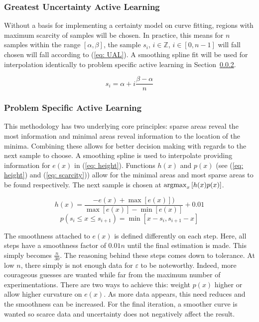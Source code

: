 \subsubsection{Greatest Uncertainty Active Learning}
Without a basis for implementing a certainty model on curve fitting, regions with maximum scarcity of samples will be chosen. In practice, this means for $n$ samples within the range $[\alpha, \beta]$, the sample $s_i$, $i\in\mathbb{Z}$, $i\in[0, n-1]$ will fall chosen will fall according to (\ref{eq: UAL}). A smoothing spline fit will be used for interpolation identically to problem specific active learning in Section~\ref{sssec:Active Learning}.

\begin{equation}
  \label{eq: UAL}
  s_i=\alpha+i\frac{\beta-\alpha}{n}
\end{equation}

\subsubsection{Problem Specific Active Learning}
\label{sssec:Active Learning}
This methodology has two underlying core principles: sparse areas reveal the most information and minimal areas reveal information to the location of the minima. Combining these allows for better decision making with regards to the next sample to choose. A smoothing spline is used to interpolate providing information for $e(x)$ in (\ref{eq: height}). Functions $h(x)$ and $p(x)$ (see (\ref{eq: height}) and (\ref{eq: scarcity})) allow for the minimal areas and most sparse areas to be found respectively. The next sample is chosen at ${\operatorname*{argmax}_x{[h(x)p(x)]}}$.

\begin{equation}
  \label{eq: height}
  {h(x)=\frac{-e(x)+\max[e(x)])}{\max[e(x)]-\min[e(x)]}}+0.01
\end{equation}
\begin{equation}
  \label{eq: scarcity}
  p(s_i \le x \le s_{i+1})=\min[x-s_i, s_{i+1}-x]
\end{equation}

The smoothness attached to $e(x)$ is defined differently on each step. Here, all steps have a smoothness factor of $0.01n$ until the final estimation is made. This simply becomes $\frac{n}{30}$. The reasoning behind these steps comes down to tolerance. At low $n$, there simply is not enough data for $\varepsilon$ to be noteworthy. Indeed, more courageous guesses are wanted while far from the maximum number of experimentations. There are two ways to achieve this: weight $p(x)$ higher or allow higher curvature on $e(x)$. As more data appears, this need reduces and the smoothness can be increased. For the final iteration, a smoother curve is wanted so scarce data and uncertainty does not negatively affect the result.

